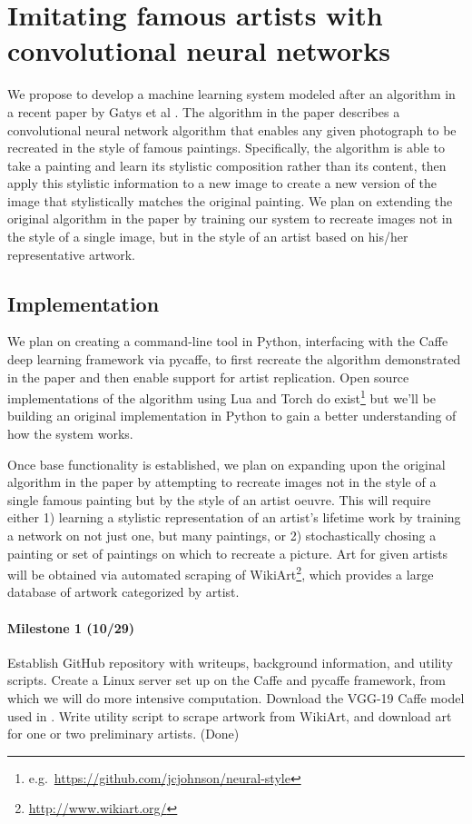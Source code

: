 \documentclass[letterpaper,10pt]{article}
\begin{document}
\section*{Imitating famous artists with convolutional neural networks}

We propose to develop a machine learning system modeled after an algorithm in a
recent paper by Gatys et al \cite{gatys15}. The algorithm in the paper
describes a convolutional neural network algorithm that enables any given
photograph to be recreated in the style of famous paintings. Specifically, the
algorithm is able to take a painting and learn its stylistic composition rather
than its content, then apply this stylistic information to a new image to
create a new version of the image that stylistically matches the original
painting. We plan on extending the original algorithm in the paper by training
our system to recreate images not in the style of a single image, but in the
style of an artist based on his/her representative artwork.

\subsection*{Implementation}

We plan on creating a command-line tool in Python, interfacing with the Caffe
\cite{jia14} deep learning framework via pycaffe, to first recreate the
algorithm demonstrated in the paper and then enable support for artist
replication. Open source implementations of the algorithm using Lua and Torch
do exist\footnote{e.g.\
  \href{https://github.com/jcjohnson/neural-style}{https://github.com/jcjohnson/neural-style}}
  but we'll be building an original implementation in Python to gain a better
  understanding of how the system works.

  Once base functionality is
  established, we plan on expanding upon the original algorithm in the paper by
  attempting to recreate images not in the style of a single famous painting
  but by the style of an artist oeuvre. This will require either 1) learning a
  stylistic representation of an artist's lifetime work by training a network
  on not just one, but many paintings, or 2) stochastically chosing a painting
  or set of paintings on which to recreate a picture. Art for given artists
  will be obtained via automated scraping of
  WikiArt\footnote{\href{http://www.wikiart.org/}{http://www.wikiart.org/}}, which provides a large database of
  artwork categorized by artist.

\paragraph{Milestone 1 (10/29)} Establish GitHub repository with writeups, background
information, and utility scripts. Create a Linux server set
up on the Caffe and pycaffe framework, from which we will do more intensive
computation. Download the VGG-19 Caffe model used in \cite{gatys15}. Write
utility script to scrape artwork from WikiArt, and download art for one or two
preliminary artists. (Done)
\end{document}
